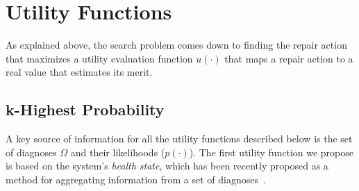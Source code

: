 \documentclass[a4paper,11pt]{report}
\newcommand\roni[1]{\textcolor{green}{roni: #1}}
\begin{document}



\section{Utility Functions} 
As explained above, the search problem comes down to finding the repair action that maximizes a utility evaluation function $u(\cdot)$ that maps a repair action to a real value that estimates its merit. 

\subsection{k-Highest Probability}

A key source of information for all the utility functions described below is the set of diagnoses $\Omega$ and their likelihoods ($p(\cdot)$). 
The first utility function we propose is based on the system's {\em health state}, which has been recently proposed as a method for aggregating information from a set of diagnoses~\cite{Stern17shelly}.
\end{document}
